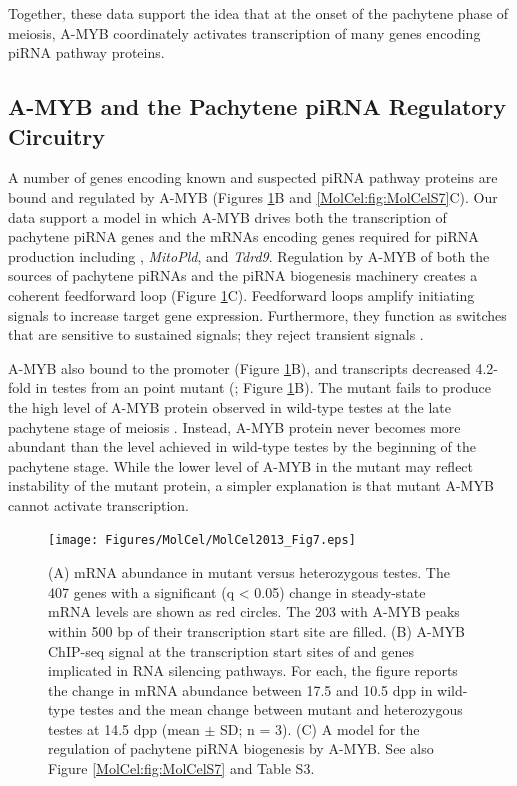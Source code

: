     Together, these data support the idea that at the onset of the pachytene phase of meiosis, A-MYB coordinately activates transcription of many genes encoding piRNA pathway proteins.

  \subsection{A-MYB and the Pachytene piRNA Regulatory Circuitry}
    \label{MolCel:subsec:A-MYB and piRNA regulatory circuitry}

    A number of genes encoding known and suspected piRNA pathway proteins are bound and regulated by A-MYB (Figures \ref{MolCel:fig:MolCelF7}B and \ref{MolCel:fig:MolCelS7}C). Our data support a model in which A-MYB drives both the transcription of pachytene piRNA genes and the mRNAs encoding genes required for piRNA production including \miwi{}, \textit{MitoPld}, and \textit{Tdrd9}. Regulation by A-MYB of both the sources of pachytene piRNAs and the piRNA biogenesis machinery creates a coherent feedforward loop (Figure \ref{MolCel:fig:MolCelF7}C). Feedforward loops amplify initiating signals to increase target gene expression. Furthermore, they function as switches that are sensitive to sustained signals; they reject transient signals \citep{Shen-Orr2002, Osella2011}. 

    A-MYB also bound to the \amyb{} promoter (Figure \ref{MolCel:fig:MolCelF7}B), and \amyb{} transcripts decreased 4.2-fold in testes from an \amyb{} point mutant (\mybrepro{}; Figure \ref{MolCel:fig:MolCelF7}B). The \amyb{} mutant fails to produce the high level of A-MYB protein observed in wild-type testes at the late pachytene stage of meiosis \citep{Bolcun-Filas2011}. Instead, A-MYB protein never becomes more abundant than the level achieved in wild-type testes by the beginning of the pachytene stage. While the lower level of A-MYB in the \amyb{} mutant may reflect instability of the mutant protein, a simpler explanation is that mutant A-MYB cannot activate \amyb{} transcription.

    \begin{figure} %
      \centering
      \texttt{[image: Figures/MolCel/MolCel2013\_Fig7.eps]}
      \caption[A-MYB Regulates Expression of mRNAs Encoding piRNA Pathway Proteins]
      {
      	(A) mRNA abundance in \amyb{} mutant versus heterozygous testes. The 407 genes with a significant (q < 0.05) change in steady-state mRNA levels are shown as red circles. The 203 with A-MYB peaks within 500 bp of their transcription start site are filled.
      	(B) A-MYB ChIP-seq signal at the transcription start sites of \amyb{} and genes implicated in RNA silencing pathways. For each, the figure reports the change in mRNA abundance between 17.5 and 10.5 dpp in wild-type testes and the mean change between \amyb{} mutant and heterozygous testes at 14.5 dpp (mean $\pm$ SD; n = 3).
      	(C) A model for the regulation of pachytene piRNA biogenesis by A-MYB. See also Figure \ref{MolCel:fig:MolCelS7} and Table S3.
      	}
      \label{MolCel:fig:MolCelF7}
    	\end{figure}

